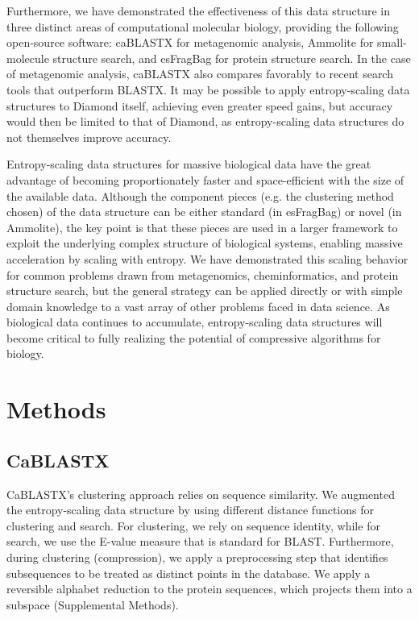 \documentclass[review,preprint,12pt]{elsarticle}
\theoremstyle{definition}
\theoremstyle{remark}
\numberwithin{equation}{section}
\begin{document}
Furthermore, we have demonstrated the effectiveness of this data structure in
three distinct areas of computational molecular biology, providing the
following open-source software: caBLASTX for metagenomic analysis, Ammolite for
small-molecule structure search, and esFragBag for protein structure search.
In the case of metagenomic analysis, caBLASTX also compares favorably to recent 
search tools that outperform BLASTX.
It may be possible to apply entropy-scaling data
structures to Diamond itself, achieving even greater speed gains, but
accuracy would then be limited to that of Diamond,
as entropy-scaling data structures do not themselves 
improve accuracy.

Entropy-scaling data structures for massive biological data have the great
advantage of becoming proportionately faster and space-efficient with the
size of the available data.
Although the component pieces (e.g. the clustering method chosen) of the data structure can be either standard (in esFragBag) or novel (in Ammolite), the key point is that these pieces are used in a larger framework to exploit the underlying complex structure of biological systems, enabling massive acceleration by scaling with entropy.
We have demonstrated this scaling behavior for common problems drawn from
metagenomics, cheminformatics, and protein structure search, but the general strategy can be applied
directly or with simple domain knowledge to a vast array of other problems
faced in data science.
As biological data continues to accumulate, entropy-scaling data structures
will become critical to fully realizing the potential of compressive
algorithms for biology. 

\section{Methods}
\subsection{CaBLASTX}
CaBLASTX's clustering approach relies on sequence similarity.
We augmented the entropy-scaling data structure by using
different distance functions for clustering and search.
For clustering, we rely on sequence identity, while for search, we use the
E-value measure that is standard for BLAST.
Furthermore, during clustering (compression), we apply a preprocessing step that
identifies subsequences to be treated as distinct points in the database.
We apply a reversible alphabet reduction to the
protein sequences, which projects them into a subspace (Supplemental Methods).
\end{document}
